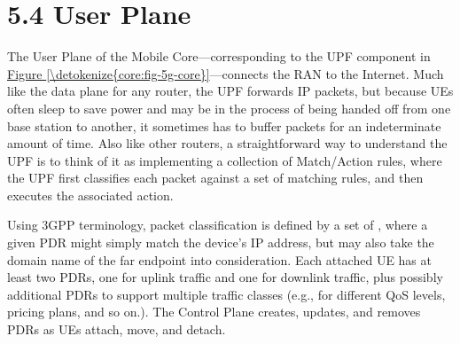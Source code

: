 \documentclass[a4paper,11pt,english]{sphinxmanual}
\begin{document}
\section{5.4 User Plane}
\label{\detokenize{core:user-plane}}
\sphinxAtStartPar
The User Plane of the Mobile Core—corresponding to the UPF component
in \hyperref[\detokenize{core:fig-5g-core}]{Figure \ref{\detokenize{core:fig-5g-core}}}—connects the RAN to the
Internet. Much like the data plane for any router, the UPF forwards IP
packets, but because UEs often sleep to save power and may be in the
process of being handed off from one base station to another, it
sometimes has to buffer packets for an indeterminate amount of
time. Also like other routers, a straightforward way to understand the
UPF is to think of it as implementing a collection of Match/Action
rules, where the UPF first classifies each packet against a set of
matching rules, and then executes the associated action.

\sphinxAtStartPar
Using 3GPP terminology, packet classification is defined by a set of
, where a given PDR might simply match
the device’s IP address, but may also take the domain name of the far
end\sphinxhyphen{}point into consideration. Each attached UE has at least two PDRs,
one for uplink traffic and one for downlink traffic, plus possibly
additional PDRs to support multiple traffic classes (e.g., for
different QoS levels, pricing plans, and so on.). The Control Plane
creates, updates, and removes PDRs as UEs attach, move, and detach.
\end{document}
